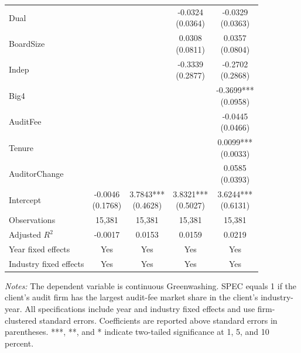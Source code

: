 \begin{table}[htbp]
{\begin{tabular}{@{}lcccc@{}}
Dual &  &  & \shortstack{-0.0324\\(0.0364)} & \shortstack{-0.0329\\(0.0363)}\\[4pt]
BoardSize &  &  & \shortstack{0.0308\\(0.0811)} & \shortstack{0.0357\\(0.0804)}\\[4pt]
Indep &  &  & \shortstack{-0.3339\\(0.2877)} & \shortstack{-0.2702\\(0.2868)}\\[4pt]
Big4 &  &  &  & \shortstack{-0.3699***\\(0.0958)}\\[4pt]
AuditFee &  &  &  & \shortstack{-0.0445\\(0.0466)}\\[4pt]
Tenure &  &  &  & \shortstack{0.0099***\\(0.0033)}\\[4pt]
AuditorChange &  &  &  & \shortstack{0.0585\\(0.0393)}\\[4pt]
Intercept & \shortstack{-0.0046\\(0.1768)} & \shortstack{3.7843***\\(0.4628)} & \shortstack{3.8321***\\(0.5027)} & \shortstack{3.6244***\\(0.6131)}\\[4pt]
Observations & 15,381 & 15,381 & 15,381 & 15,381\\
Adjusted \(R^2\) & -0.0017 & 0.0153 & 0.0159 & 0.0219\\
Year fixed effects & Yes & Yes & Yes & Yes\\
Industry fixed effects & Yes & Yes & Yes & Yes\\
\hline\end{tabular}}
\vspace{0.4em}
\begin{minipage}{0.92\textwidth}\footnotesize\textit{Notes:} The dependent variable is continuous Greenwashing. SPEC equals 1 if the client's audit firm has the largest audit-fee market share in the client's industry-year. All specifications include year and industry fixed effects and use firm-clustered standard errors. Coefficients are reported above standard errors in parentheses. ***, **, and * indicate two-tailed significance at 1, 5, and 10 percent.\end{minipage}
\end{table}